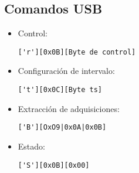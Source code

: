 \subsection{Comandos USB}
\begin{itemize}
\item Control: \begin{verbatim}['r'][0x0B][Byte de control]\end{verbatim}
\item Configuraci\'on de intervalo: \begin{verbatim}['t'][0x0C][Byte ts]\end{verbatim}
\item Extracci\'on de adquisiciones: \begin{verbatim}['B'][OxO9|0x0A|0x0B]\end{verbatim}
\item Estado: \begin{verbatim}['S'][0x0B][0x00]\end{verbatim}
\end{itemize}

\newpage